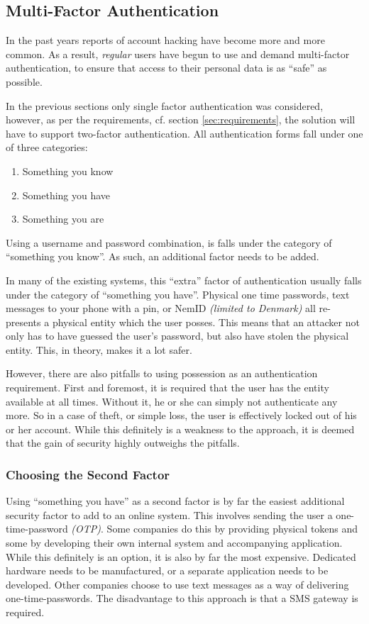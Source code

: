 		\subsection{Multi-Factor Authentication}
			\label{sec:mfa}
			In the past years reports of account hacking have become more and more common. As a result, \emph{regular} users have begun to use and demand multi-factor authentication, to ensure that access to their personal data is as ``safe'' as possible. 

			In the previous sections only single factor authentication was considered, however, as per the requirements, cf. section \ref{sec:requirements}, the solution will have to support two-factor authentication. All authentication forms fall under one of three categories:
			\begin{enumerate}
				\item Something you know
				\item Something you have
				\item Something you are
			\end{enumerate}
			Using a username and password combination, is falls under the category of ``something you know''. As such, an additional factor needs to be added. 

			In many of the existing systems, this ``extra'' factor of authentication usually falls under the category of ``something you have''. Physical one time passwords, text messages to your phone with a pin, or NemID \emph{(limited to Denmark)} all re-presents a physical entity which the user posses. This means that an attacker not only has to have guessed the user's password, but also have stolen the physical entity. This, in theory, makes it a lot safer.

			However, there are also pitfalls to using possession as an authentication requirement. First and foremost, it is required that the user has the entity available at all times. Without it, he or she can simply not authenticate any more. So in a case of theft, or simple loss, the user is effectively locked out of his or her account. While this definitely is a weakness to the approach, it is deemed that the gain of security highly outweighs the pitfalls.

			\subsubsection{Choosing the Second Factor}
				Using ``something you have'' as a second factor is by far the easiest additional security factor to add to an online system. This involves sending the user a one-time-password \emph{(OTP)}. Some companies do this by providing physical tokens and some by developing their own internal system and accompanying application. While this definitely is an option, it is also by far the most expensive. Dedicated hardware needs to be manufactured, or a separate application needs to be developed. Other companies choose to use text messages as a way of delivering one-time-passwords. The disadvantage to this approach is that a SMS gateway is required.

